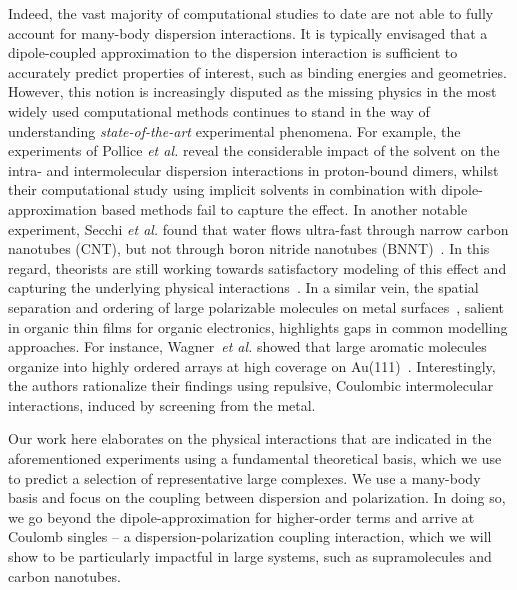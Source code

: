 \documentclass[aps,prl,groupaddress, twocolumn]{revtex4-1}  %
\begin{document}
Indeed, the vast majority of computational studies to date are not able to fully account for many-body dispersion interactions. It is typically envisaged that a dipole-coupled approximation to the dispersion interaction is sufficient to accurately predict properties of interest, such as binding energies and geometries. However, this notion is increasingly disputed as the missing physics in the most widely used computational methods continues to stand in the way of understanding \textit{state-of-the-art} experimental phenomena. For example, the experiments of Pollice \textit{et al.} reveal the considerable impact of the solvent on the intra- and intermolecular dispersion interactions in proton-bound dimers\cite{Pollice2017}, whilst their computational study using implicit solvents in combination with dipole-approximation based methods fail to capture the effect. In another notable experiment, Secchi \textit{et al.} found that water flows ultra-fast through narrow carbon nanotubes (CNT), but not through boron nitride nanotubes (BNNT)~\cite{secchi2016massive}. In this regard, theorists are still working towards satisfactory modeling of this effect and capturing the underlying physical interactions~\cite{Michaelides2016,Kannam2013,Striolo2016,Mattia2015266}. In a similar vein, the spatial separation and ordering of large polarizable molecules on metal surfaces~\cite{Wagner2010,Thussing2016}, salient in organic thin films for organic electronics, highlights gaps in common modelling approaches. For instance, Wagner~\textit{et al.} showed that large aromatic molecules organize into highly ordered arrays at high coverage on Au(111)~\cite{Wagner2010}. Interestingly, the authors rationalize their findings using repulsive, Coulombic intermolecular interactions, induced by screening from the metal. %

Our work here elaborates on the physical interactions that are indicated in the aforementioned experiments using a fundamental theoretical basis, which we use to predict a selection of representative large complexes. We use a many-body basis and focus on the coupling between dispersion and polarization. In doing so, we go beyond the dipole-approximation for higher-order terms and arrive at Coulomb singles – a dispersion-polarization coupling interaction, which we will show to be particularly impactful in large systems, such as supramolecules and carbon nanotubes.   
\end{document}
